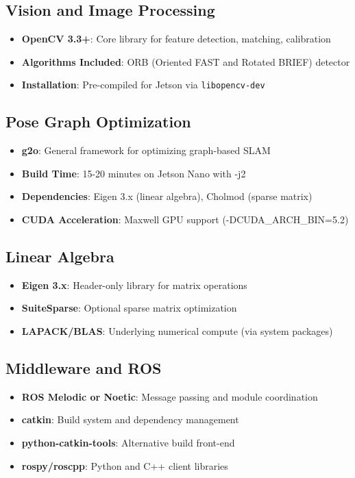\subsection{Vision and Image Processing}
\begin{itemize}
    \item \textbf{OpenCV 3.3+}: Core library for feature detection, matching, calibration
    \item \textbf{Algorithms Included}: ORB (Oriented FAST and Rotated BRIEF) detector
    \item \textbf{Installation}: Pre-compiled for Jetson via \texttt{libopencv-dev}
\end{itemize}

\subsection{Pose Graph Optimization}
\begin{itemize}
    \item \textbf{g2o}: General framework for optimizing graph-based SLAM
    \item \textbf{Build Time}: 15-20 minutes on Jetson Nano with -j2
    \item \textbf{Dependencies}: Eigen 3.x (linear algebra), Cholmod (sparse matrix)
    \item \textbf{CUDA Acceleration}: Maxwell GPU support (-DCUDA\_ARCH\_BIN=5.2)
\end{itemize}

\subsection{Linear Algebra}
\begin{itemize}
    \item \textbf{Eigen 3.x}: Header-only library for matrix operations
    \item \textbf{SuiteSparse}: Optional sparse matrix optimization
    \item \textbf{LAPACK/BLAS}: Underlying numerical compute (via system packages)
\end{itemize}

\subsection{Middleware and ROS}
\begin{itemize}
    \item \textbf{ROS Melodic or Noetic}: Message passing and module coordination
    \item \textbf{catkin}: Build system and dependency management
    \item \textbf{python-catkin-tools}: Alternative build front-end
    \item \textbf{rospy/roscpp}: Python and C++ client libraries
\end{itemize}

